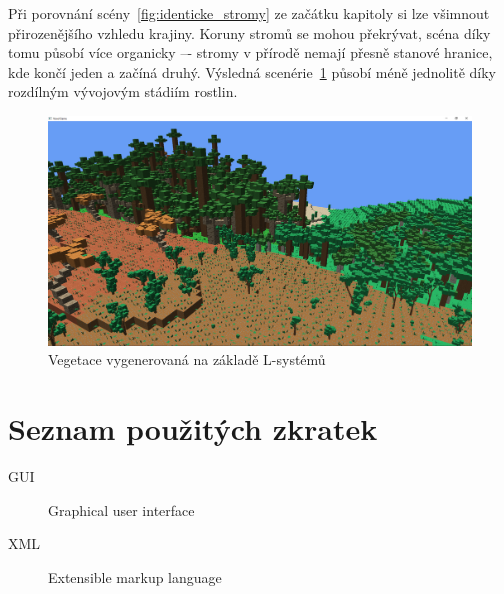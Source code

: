 \documentclass[thesis=M,czech]{FITthesis}[2019/12/23]
\begin{document}
Při porovnání scény~\ref{fig:identicke_stromy} ze začátku kapitoly si lze všimnout přirozenějšího vzhledu krajiny. Koruny stromů se mohou překrývat, scéna díky tomu působí více organicky –- stromy v přírodě nemají přesně stanové hranice, kde končí jeden a začíná druhý. Výsledná scenérie~\ref{fig:new_vegetation} působí méně jednolitě díky rozdílným vývojovým stádiím rostlin.

\begin{figure}\centering
	\includegraphics[width=\textwidth]{images/new_vegetation}
	\caption[Vegetace vygenerovaná na základě L-systémů]{Vegetace vygenerovaná na základě L-systémů}\label{fig:new_vegetation}
\end{figure}


\begin{conclusion}
\end{conclusion}




\appendix

\chapter{Seznam použitých zkratek}
\begin{description}
	\item[GUI] Graphical user interface
	\item[XML] Extensible markup language
\end{description}
\end{document}
